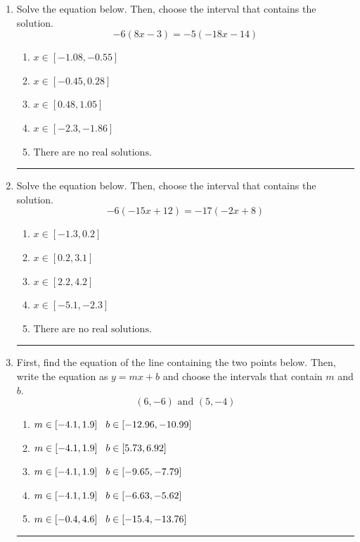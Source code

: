 \documentclass[14pt]{extbook}
\newcommand{\litem}[1]{\item#1\hspace*{-1cm}\rule{\textwidth}{0.4pt}}
\begin{document}
\begin{enumerate}
{\begin{enumerate}[label=\Alph*.]
\end{enumerate} }
\litem{
Solve the equation below. Then, choose the interval that contains the solution.\[ -6(8x -3) = -5(-18x -14) \]\begin{enumerate}[label=\Alph*.]
\item \( x \in [-1.08, -0.55] \)
\item \( x \in [-0.45, 0.28] \)
\item \( x \in [0.48, 1.05] \)
\item \( x \in [-2.3, -1.86] \)
\item \( \text{There are no real solutions.} \)

\end{enumerate} }
\litem{
Solve the equation below. Then, choose the interval that contains the solution.\[ -6(-15x + 12) = -17(-2x + 8) \]\begin{enumerate}[label=\Alph*.]
\item \( x \in [-1.3, 0.2] \)
\item \( x \in [0.2, 3.1] \)
\item \( x \in [2.2, 4.2] \)
\item \( x \in [-5.1, -2.3] \)
\item \( \text{There are no real solutions.} \)

\end{enumerate} }
\litem{
First, find the equation of the line containing the two points below. Then, write the equation as $ y=mx+b $ and choose the intervals that contain $m$ and $b$.\[ (6, -6) \text{ and } (5, -4) \]\begin{enumerate}[label=\Alph*.]
\item \( m \in [-4.1, 1.9] \hspace*{3mm} b \in [-12.96, -10.99] \)
\item \( m \in [-4.1, 1.9] \hspace*{3mm} b \in [5.73, 6.92] \)
\item \( m \in [-4.1, 1.9] \hspace*{3mm} b \in [-9.65, -7.79] \)
\item \( m \in [-4.1, 1.9] \hspace*{3mm} b \in [-6.63, -5.62] \)
\item \( m \in [-0.4, 4.6] \hspace*{3mm} b \in [-15.4, -13.76] \)


\end{enumerate}}
\end{enumerate}
\end{document}

